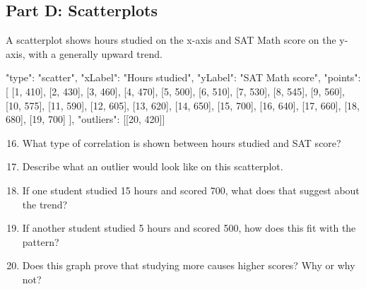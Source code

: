 \documentclass[14pt]{extarticle}
\begin{document}
\subsection*{Part D: Scatterplots}
A scatterplot shows hours studied on the x-axis and SAT Math score on the y-axis, with a generally upward trend.

\begin{diagramdata}
{
  "type": "scatter",
  "xLabel": "Hours studied",
  "yLabel": "SAT Math score",
  "points": [
    [1, 410], [2, 430], [3, 460], [4, 470], [5, 500], [6, 510], [7, 530],
    [8, 545], [9, 560], [10, 575], [11, 590], [12, 605], [13, 620],
    [14, 650], [15, 700], [16, 640], [17, 660], [18, 680], [19, 700]
  ],
  "outliers": [[20, 420]]
}
\end{diagramdata}

\begin{enumerate}
  \setcounter{enumi}{15}
  \item What type of correlation is shown between hours studied and SAT score?
  \item Describe what an outlier would look like on this scatterplot.
  \item If one student studied 15 hours and scored 700, what does that suggest about the trend?
  \item If another student studied 5 hours and scored 500, how does this fit with the pattern?
  \item Does this graph prove that studying more causes higher scores? Why or why not?
\end{enumerate}
\end{document}
